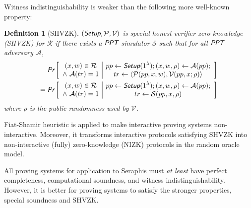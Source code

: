 \documentclass{article}
\theoremstyle{plain}
\newtheorem{definition}{Definition}[section]
\theoremstyle{remark}
\begin{document}
Witness indistinguishability is weaker \cite{groth} than the following more well-known property:
\begin{definition}[SHVZK]
$(\emph{\textsf{Setup}}, \mathcal{P}, \mathcal{V})$ is special honest-verifier zero knowledge (SHVZK) for $\mathcal{R}$ if there exists a $\emph{\textsf{PPT}}$ simulator $\mathcal{S}$ such that for all $\emph{\textsf{PPT}}$ adversary $\mathcal{A}$,
\begin{align*}
\emph{\textsf{Pr}}\left[
\begin{array}{c|c}
    \begin{gathered}
        (x,w)\in\mathcal{R}\\
        \wedge\ \mathcal{A}(tr) = 1
    \end{gathered}
    &
    \begin{gathered}
        pp\leftarrow\emph{\textsf{Setup}}(1^{\lambda}); (x, w, \rho)\leftarrow\mathcal{A}(pp); \\
        tr\leftarrow\langle\mathcal{P}(pp,x,w), \mathcal{V}(pp,x; \rho)\rangle
    \end{gathered}
\end{array}
\right] \\
=\emph{\textsf{Pr}}\left[
\begin{array}{c|c}
    \begin{gathered}
        (x,w)\in\mathcal{R}\\
        \wedge\ \mathcal{A}(tr) = 1
    \end{gathered}
    &
    \begin{gathered}
        pp\leftarrow\emph{\textsf{Setup}}(1^{\lambda}); (x, w, \rho)\leftarrow\mathcal{A}(pp); \\
        tr\leftarrow\mathcal{S}(pp, x, \rho)
    \end{gathered}
\end{array}
\right]
\end{align*}
where $\rho$ is the public randomness used by $\mathcal{V}$.
\end{definition}

Fiat-Shamir heuristic \cite{fiat-shamir} is applied to make interactive proving systems non-interactive. Moreover, it transforms interactive protocols satisfying SHVZK into non-interactive (fully) zero-knowledge (NIZK) protocols in the random oracle model.

All proving systems for application to Seraphis must \textit{at least} have perfect completeness,  computational soundness, and witness indistinguishability. However, it is better for proving systems to satisfy the stronger properties, special soundness and SHVZK.
\end{document}
